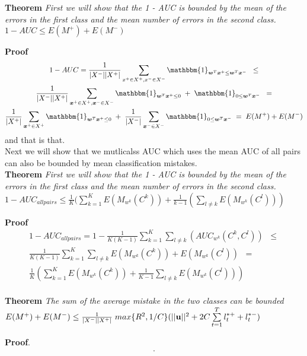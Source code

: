 \documentclass[twoside,11pt]{article}
\newcommand{\vxp}{\vx^+}
\newcommand{\vxn}{\vx^-}
\begin{document}
\noindent

{\bf Theorem} {\it First we will show that the 1 - AUC is bounded by the mean 
of the errors in the first class and the mean number of errors in the second
class.  $1 - AUC \leq E(M^+) + E(M^-)$ 
} \hfill\BlackBox

{\bf Proof} 
\begin{multline}
1 - AUC = \frac{1}{|X^-| |X^+|} \sum\limits_{x^+ \in X^+, x^- \in X^-}{  \mathbbm{1}_{\vw^T \vx^+ \leq \vw^T \vx^-} } \;\;\leq \\
\frac{1}{|X^-| |X^+|}  \sum\limits_{\vxp \in X^+, \vxn \in X^-}{  \mathbbm{1}_{\vw^T \vxp \leq 0} \;+\; \mathbbm{1}_{0 \leq \vw^T \vxn}  }  \;\;= \\
\frac{1}{|X^+|}  \sum\limits_{\vxp \in X^+}{  \mathbbm{1}_{\vw^T \vxp \leq 0} } \;+\; \frac{1}{|X^-|}  \sum\limits_{\vxn \in X^-}{\mathbbm{1}_{0 \leq \vw^T \vxn }  }   \;= \;
E(M^+) + E(M^-)
\end{multline}
and that is that.\\

Next we will show that we mutlicalss AUC which uses the mean AUC of all pairs can also be bounded by mean classification mistakes.\\

{\bf Theorem} {\it First we will show that the 1 - AUC is bounded by the mean 
of the errors in the first class and the mean number of errors in the second
class.  $1 - AUC_{all pairs} \leq \frac{1}{K} ( \sum\limits_{k=1}^{K} E(M_{w^k}(C^k)) + \frac{1}{k-1} ( \sum\limits_{l \neq k}  E(M_{w^k}(C^l)) ) $ 
} \hfill\BlackBox

{\bf Proof} 
\begin{multline}
1 - AUC_{all pairs}  = 1 - \frac{1}{K(K-1)} \sum\limits_{k=1}^{K}  \sum\limits_{l \neq k} (AUC_{w^k}(C^k, C^l)) \;\;\leq \\
\frac{1}{K(K-1)} \sum\limits_{k=1}^{K}  \sum\limits_{l \neq k} E(M_{w^k}(C^k)) + E(M_{w^k}(C^l)) \;\; = \\
\frac{1}{K} ( \sum\limits_{k=1}^{K}  E(M_{w^k}(C^k)) +  \frac{1}{K-1} \sum\limits_{l \neq k} E(M_{w^k}(C^l)  ))
\end{multline}
\\

{\bf Theorem} {\it The sum of the average mistake in the two classes can be bounded \\
$E(M^+) + E(M^-) \leq 
\frac{1}{|X^-| |X^+|} \; max\{R^2, 1/C\}( ||{\bf u}||^2 + 2C \sum\limits_{t=1}^T{ l_t^{*+} + l_t^{*-}} ) $
} \hfill\BlackBox

{\bf Proof}.
\begin{multline}
.
\end{multline}


\vskip 0.2in

\end{document}
